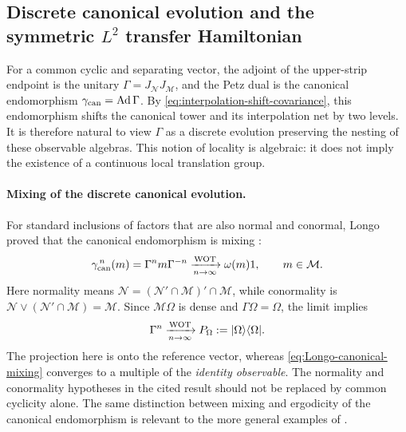 \documentclass[a4paper,11pt]{article}
\theoremstyle{definition}
\newcommand{\mN}{\mathcal{N}}
\newcommand{\mM}{\mathcal{M}}
\begin{document}
\subsection{Discrete canonical evolution and the symmetric $L^2$ transfer Hamiltonian}
\label{subsec:emergent-transfer-time}

For a common cyclic and separating vector, the adjoint of the upper-strip
endpoint is the unitary $\Gamma=J_{\mN}J_{\mM}$, and the Petz dual is the
canonical endomorphism $\gamma_{\rm can}=\operatorname{Ad}\Gamma$.
By \eqref{eq:interpolation-shift-covariance}, this endomorphism shifts the
canonical tower and its interpolation net by two levels. It is therefore
natural to view $\Gamma$ as a discrete evolution preserving the nesting of
these observable algebras. This notion of locality is algebraic: it does
not imply the existence of a continuous local translation group.

\paragraph{Mixing of the discrete canonical evolution.}
For standard inclusions of factors that are also normal and conormal,
Longo proved that the canonical endomorphism is mixing
\cite{Longo1984FactorialStoneWeierstrass,Longo1985Pseudonormalcy}:
\begin{equation}
    \gamma_{\rm can}^{\,n}(m)
    =\Gamma^n m\Gamma^{-n}
    \xrightarrow[n\to\infty]{\rm WOT}
    \omega(m)1,\qquad m\in\mM.
    \label{eq:Longo-canonical-mixing}
\end{equation}
Here normality means $\mN=(\mN'\cap\mM)'\cap\mM$, while
conormality is $\mN\vee(\mN'\cap\mM)=\mM$. Since $\mM\Omega$
is dense and $\Gamma\Omega=\Omega$, the limit implies
\begin{equation}
    \Gamma^n\xrightarrow[n\to\infty]{\rm WOT}
    P_\Omega:=|\Omega\rangle\langle\Omega|.
    \label{eq:Longo-Gamma-weak}
\end{equation}
The projection here is onto the reference vector, whereas
\eqref{eq:Longo-canonical-mixing} converges to a multiple of the
\emph{identity observable}. The normality and conormality hypotheses
in the cited result should not be replaced by common cyclicity alone.
The same distinction between mixing and ergodicity of the canonical
endomorphism is relevant to the more general examples of
\cite{LongoTanimotoUeda2019}.
\end{document}
